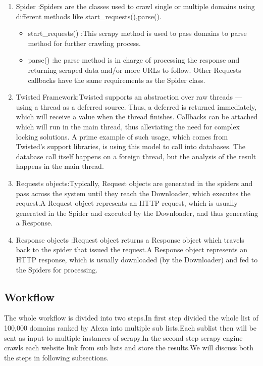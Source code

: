 \begin{enumerate}
   \item Spider :Spiders are the classes used to crawl single or multiple domains using different methods like start\_requests(),parse().
   \begin{itemize}
     \item start\_requests() :This scrapy method is used to pass domains to parse method for further crawling process.
     \item parse() :he parse method is in charge of processing the response and returning scraped data and/or more URLs to follow. Other Requests callbacks have the same requirements as the Spider class.
   \end{itemize}
      \item Twisted Framework:Twisted supports an abstraction over raw threads — using a thread as a deferred source. Thus, a deferred is returned immediately, which will receive a value when the thread finishes. Callbacks can be attached which will run in the main thread, thus alleviating the need for complex locking solutions. A prime example of such usage, which comes from Twisted's support libraries, is using this model to call into databases. The database call itself happens on a foreign thread, but the analysis of the result happens in the main thread.
      \item Requests objects:Typically, Request objects are generated in the spiders and pass across the system until they reach the Downloader, which executes the request.A Request object represents an HTTP request, which is usually generated in the Spider and executed by the Downloader, and thus generating a Response.
	\item Response objects :Request object returns a Response object which travels back to the spider that issued the request.A Response object represents an HTTP response, which is usually downloaded (by the Downloader) and fed to the Spiders for processing.

\end{enumerate}
\subsection{Workflow}
The whole workflow is divided into two steps.In first step divided the whole list of 100,000 domains ranked by Alexa into multiple sub lists.Each sublist then will be sent as input to multiple instances of scrapy.In the second step scrapy engine crawls each website link from sub lists and store the results.We will discuss both the steps in following subsections.
